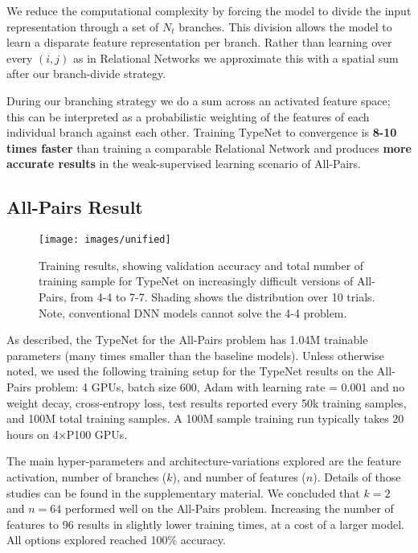 We reduce the computational complexity by forcing the model to divide
the input representation through a set of $N_t$ branches. This
division allows the model to learn a disparate feature
representation per branch. Rather than learning over every $(i,j)$ as in Relational Networks \cite{santoro2017simple} we
approximate this with a spatial sum after our branch-divide
strategy.

During our branching strategy we do a sum across an activated feature
space; this can be interpreted as a probabilistic weighting of the
features of each individual branch against each other. Training TypeNet to convergence is \textbf{8-10 times faster} than training a comparable Relational Network and produces \textbf{more accurate results} in the
weak-supervised learning scenario of All-Pairs.

\subsection{All-Pairs Result} \label{allpairsresult}

\begin{figure*}[!htb]
  \texttt{[image: images/unified]}
\caption{Training results, showing validation accuracy and total number of training sample for TypeNet on increasingly difficult versions of All-Pairs, from 4-4 to 7-7.  Shading shows the distribution over 10 trials.  Note, conventional DNN models cannot solve the 4-4 problem.}
\label{solving_all_pairs}
\end{figure*}

As described, the TypeNet for the All-Pairs problem has 1.04M trainable parameters
(many times smaller than the baseline models).
Unless otherwise noted, we used the following training setup for the
TypeNet results on the All-Pairs problem: 4 GPUs, batch size 600, Adam
with learning rate = 0.001 and no weight decay, cross-entropy loss, test
results reported every 50k training samples, and 100M total training samples.
A 100M sample training run typically takes 20 hours on 4${\mkern-1.5mu\times\mkern-1.5mu}$P100 GPUs.

The main hyper-parameters and architecture-variations explored are the
feature activation, number of branches ($k$), and number of features
($n$).  Details of those studies can be found in the supplementary material.  We concluded that $k = 2$ and $n = 64$ performed well on the All-Pairs problem.  Increasing the number of features to 96 results in slightly lower training times, at a cost of a larger model.  All options explored reached 100\% accuracy.

